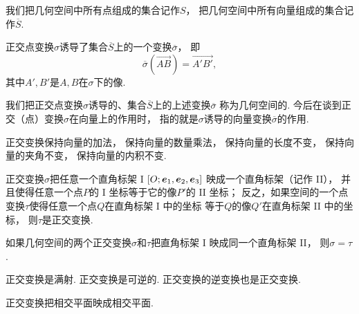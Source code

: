 我们把几何空间中所有点组成的集合记作\(S\)，
把几何空间中所有向量组成的集合记作\(\overline{S}\).
\begin{property}
正交点变换\(\sigma\)诱导了集合\(\overline{S}\)上的一个变换\(\overline{\sigma}\)，
即\begin{equation*}
	\overline{\sigma}(\vec{AB}) = \vec{A'B'},
\end{equation*}
其中\(A',B'\)是\(A,B\)在\(\sigma\)下的像.
\end{property}

我们把正交点变换\(\sigma\)诱导的、集合\(\overline{S}\)上的上述变换\(\overline{\sigma}\)
称为几何空间的.
今后在谈到正交（点）变换\(\sigma\)在向量上的作用时，
指的就是\(\sigma\)诱导的向量变换\(\overline{\sigma}\)的作用.

\begin{property}
正交变换保持向量的加法，
保持向量的数量乘法，
保持向量的长度不变，
保持向量的夹角不变，
保持向量的内积不变.
\end{property}

\begin{theorem}
正交变换\(\sigma\)把任意一个直角标架 I \([O;\boldsymbol{e}_1,\boldsymbol{e}_2,\boldsymbol{e}_3]\)
映成一个直角标架（记作 II），
并且使得任意一个点\(P\)的 I 坐标等于它的像\(P'\)的 II 坐标；
反之，如果空间的一个点变换\(\tau\)使得任意一个点\(Q\)在直角标架 I 中的坐标
等于\(Q\)的像\(Q'\)在直角标架 II 中的坐标，
则\(\tau\)是正交变换.
\end{theorem}

\begin{corollary}
如果几何空间的两个正交变换\(\sigma\)和\(\tau\)把直角标架 I 映成同一个直角标架 II，
则\(\sigma = \tau\).
\end{corollary}

\begin{property}
正交变换是满射.
正交变换是可逆的.
正交变换的逆变换也是正交变换.
\end{property}

\begin{property}
正交变换把相交平面映成相交平面.
\end{property}

